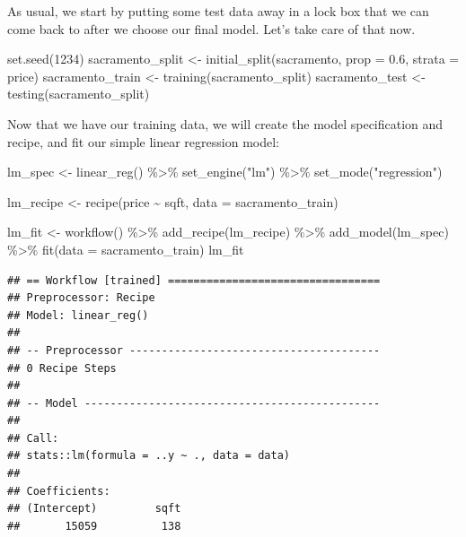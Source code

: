 \documentclass[
]{krantz}
\makeatletter
\newenvironment{Shaded}{\begin{snugshade}}{\end{snugshade}}
\newcommand{\AttributeTok}[1]{\textcolor[rgb]{0.61,0.61,0.61}{#1}}
\newcommand{\DecValTok}[1]{\textcolor[rgb]{0.06,0.06,0.06}{#1}}
\newcommand{\FloatTok}[1]{\textcolor[rgb]{0.06,0.06,0.06}{#1}}
\newcommand{\FunctionTok}[1]{\textcolor[rgb]{0,0,0}{#1}}
\newcommand{\NormalTok}[1]{#1}
\newcommand{\OtherTok}[1]{\textcolor[rgb]{0.37,0.37,0.37}{#1}}
\newcommand{\SpecialCharTok}[1]{\textcolor[rgb]{0,0,0}{#1}}
\newcommand{\StringTok}[1]{\textcolor[rgb]{0.5,0.5,0.5}{#1}}
\newenvironment{kframe}{%
\medskip{}
\setlength{\fboxsep}{.8em}
 \def\at@end@of@kframe{}%
 \ifinner\ifhmode%
  \def\at@end@of@kframe{\end{minipage}}%
  \begin{minipage}{\columnwidth}%
 \fi\fi%
 \def\FrameCommand##1{\hskip\@totalleftmargin \hskip-\fboxsep
 \colorbox{shadecolor}{##1}\hskip-\fboxsep
     \hskip-\linewidth \hskip-\@totalleftmargin \hskip\columnwidth}%
 \MakeFramed {\advance\hsize-\width
   \@totalleftmargin\z@ \linewidth\hsize
   \@setminipage}}%
 {\par\unskip\endMakeFramed%
 \at@end@of@kframe}
\renewenvironment{Shaded}{\begin{kframe}}{\end{kframe}}
\makeatother
\begin{document}
As usual, we start by putting some test data away in a lock box that we
can come back to after we choose our final model. Let's take care of that now.

\begin{Shaded}
\begin{Highlighting}[]
\FunctionTok{set.seed}\NormalTok{(}\DecValTok{1234}\NormalTok{)}
\NormalTok{sacramento\_split }\OtherTok{\textless{}{-}} \FunctionTok{initial\_split}\NormalTok{(sacramento, }\AttributeTok{prop =} \FloatTok{0.6}\NormalTok{, }\AttributeTok{strata =}\NormalTok{ price)}
\NormalTok{sacramento\_train }\OtherTok{\textless{}{-}} \FunctionTok{training}\NormalTok{(sacramento\_split)}
\NormalTok{sacramento\_test }\OtherTok{\textless{}{-}} \FunctionTok{testing}\NormalTok{(sacramento\_split)}
\end{Highlighting}
\end{Shaded}

Now that we have our training data, we will create the model specification
and recipe, and fit our simple linear regression model:

\begin{Shaded}
\begin{Highlighting}[]
\NormalTok{lm\_spec }\OtherTok{\textless{}{-}} \FunctionTok{linear\_reg}\NormalTok{() }\SpecialCharTok{\%\textgreater{}\%}
  \FunctionTok{set\_engine}\NormalTok{(}\StringTok{"lm"}\NormalTok{) }\SpecialCharTok{\%\textgreater{}\%}
  \FunctionTok{set\_mode}\NormalTok{(}\StringTok{"regression"}\NormalTok{)}

\NormalTok{lm\_recipe }\OtherTok{\textless{}{-}} \FunctionTok{recipe}\NormalTok{(price }\SpecialCharTok{\textasciitilde{}}\NormalTok{ sqft, }\AttributeTok{data =}\NormalTok{ sacramento\_train)}

\NormalTok{lm\_fit }\OtherTok{\textless{}{-}} \FunctionTok{workflow}\NormalTok{() }\SpecialCharTok{\%\textgreater{}\%}
  \FunctionTok{add\_recipe}\NormalTok{(lm\_recipe) }\SpecialCharTok{\%\textgreater{}\%}
  \FunctionTok{add\_model}\NormalTok{(lm\_spec) }\SpecialCharTok{\%\textgreater{}\%}
  \FunctionTok{fit}\NormalTok{(}\AttributeTok{data =}\NormalTok{ sacramento\_train)}
\NormalTok{lm\_fit}
\end{Highlighting}
\end{Shaded}

\begin{verbatim}
## == Workflow [trained] =================================
## Preprocessor: Recipe
## Model: linear_reg()
## 
## -- Preprocessor ---------------------------------------
## 0 Recipe Steps
## 
## -- Model ----------------------------------------------
## 
## Call:
## stats::lm(formula = ..y ~ ., data = data)
## 
## Coefficients:
## (Intercept)         sqft  
##       15059          138
\end{verbatim}
\end{document}
